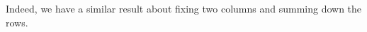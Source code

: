\begin{comment}
We can use this to prove an important result about the regular representation.

\begin{theorem}\label{Ch2:Thm:Reg_Rep_Col_1}
    Let $\chi_{\reg}$ denote the character of the regular representation of $G$ over $\C$. Then,
    \begin{align*}
        \chi_{\reg} &= \sum_{j=1}^{k} \chiof{j}{1} \chi_j
    \end{align*}
\end{theorem}
\begin{proof}
    
    \verb|sorry|  %
\end{proof}

\begin{corollary} \label{Ch2:Cor:Reg_Rep_Col_1_Grp_Size}
    $\sum_{i=1}^{k} \parenth{\chiof{i}{1}}^2 = \abs{G}$.
\end{corollary}
\begin{proof}
    We evaluate both sides of the expression in Theorem~\ref{Ch2:Thm:Reg_Rep_Col_1} at $1$ to obtain that
    \begin{align*}
        \chiof{\reg}{1} = \sum_{i=1}^{k} \parenth{\chi_i(1)}^2 = \abs{G}        
    \end{align*}
\end{proof}
\end{comment}

Indeed, we have a similar result about fixing two columns and summing down the rows.

